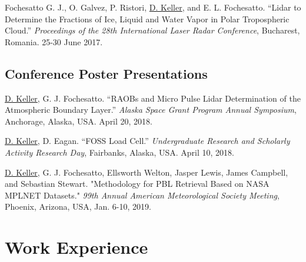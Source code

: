 \documentclass[12pt,a4paper]{article}
\begin{document}
\begin{hangparas}{20pt}{1}
Fochesatto G. J., O. Galvez, P. Ristori, \underline{D. Keller}, and E. L. Fochesatto. “Lidar to Determine the
Fractions of Ice, Liquid and Water Vapor in Polar Tropospheric Cloud.” \textit{Proceedings of the 28th
International Laser Radar Conference}, Bucharest, Romania. 25-30 June 2017.
\end{hangparas}

\subsection*{Conference Poster Presentations}

\begin{hangparas}{20pt}{1}
\underline{D. Keller}, G. J. Fochesatto. “RAOBs and Micro Pulse Lidar Determination of the Atmospheric
Boundary Layer.” \textit{Alaska Space Grant Program Annual Symposium}, Anchorage, Alaska, USA.
April 20, 2018.

\underline{D. Keller}, D. Eagan. “FOSS Load Cell.” \textit{Undergraduate Research and Scholarly Activity Research Day}, Fairbanks, Alaska, USA. April 10, 2018.

\underline{D. Keller}, G. J. Fochesatto, Ellsworth Welton, Jasper Lewis, James Campbell, and Sebastian Stewart. "Methodology for PBL Retrieval Based on NASA MPLNET Datasets." \textit{99th Annual American Meteorological Society Meeting}, Phoenix, Arizona, USA, Jan. 6-10, 2019.
\end{hangparas}

\section*{Work Experience}
\end{document}
